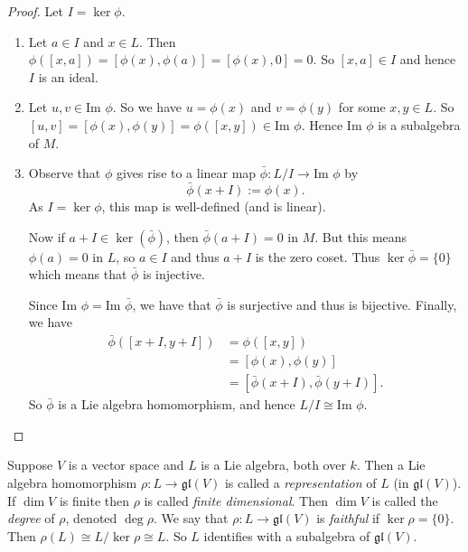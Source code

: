 \begin{proof}
	Let $I = \ker\phi$.
	\begin{enumerate}
		\item Let $a \in I$ and $x \in L$. Then $\phi([x, a]) = [\phi(x), \phi(a)] = [\phi(x), 0] = 0$. So $[x, a] \in I$ and hence $I$ is an ideal.
		\item Let $u, v \in \text{Im }\phi$. So we have $u = \phi(x)$ and $v = \phi(y)$ for some $x, y \in L$. So $[u, v] = [\phi(x), \phi(y)] = \phi([x, y]) \in \text{Im }\phi$. Hence $\text{Im }\phi$ is a subalgebra of $M$.
		\item Observe that $\phi$ gives rise to a linear map $\bar{\phi} : L / I \to \text{Im }\phi$ by
		\[
			\bar{\phi}(x + I) := \phi(x).
		\]
		As $I = \ker\phi$, this map is well-defined (and is linear).
		
		Now if $a + I \in \ker(\bar{\phi})$, then $\bar{\phi}(a + I) = 0$ in $M$. But this means $\phi(a) = 0$ in $L$, so $a \in I$ and thus $a + I$ is the zero coset. Thus $\ker\bar{\phi} = \{0\}$ which means that $\bar{\phi}$ is injective.
		
		Since $\text{Im }\phi = \text{Im }\bar{\phi}$, we have that $\bar{\phi}$ is surjective and thus is bijective. Finally, we have
		\begin{align*}
			\bar{\phi}([x + I, y + I]) &= \phi([x, y]) \\
									   &= [\phi(x), \phi(y)] \\
									   &= [\bar{\phi}(x + I), \bar{\phi}(y + I)].
		\end{align*}
		So $\bar{\phi}$ is a Lie algebra homomorphism, and hence $L / I \cong \text{Im }\phi$.
	\end{enumerate}
\end{proof}

Suppose $V$ is a vector space and $L$ is a Lie algebra, both over $k$. Then a Lie algebra homomorphism $\rho : L \to \mathfrak{gl}(V)$ is called a \emph{representation} of $L$ (in $\mathfrak{gl}(V)$). If $\dim V$ is finite then $\rho$ is called \emph{finite dimensional}. Then $\dim V$ is called the \emph{degree} of $\rho$, denoted $\deg\rho$. We say that $\rho : L \to \mathfrak{gl}(V)$ is \emph{faithful} if $\ker\rho = \{ 0 \}$. Then $\rho(L) \cong L/\ker\rho \cong L$. So $L$ identifies with a subalgebra of $\mathfrak{gl}(V)$.

